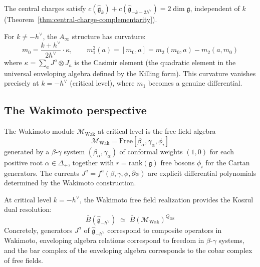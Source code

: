 \begin{remark}\label{rem:km-central-charge-sum}
The central charges satisfy $c(\widehat{\mathfrak{g}}_k) + c(\widehat{\mathfrak{g}}_{-k-2h^\vee}) = 2\dim\mathfrak{g}$, independent of $k$ (Theorem~\ref{thm:central-charge-complementarity}).
\end{remark}

\begin{definition}\label{def:curved-koszul-km}
For $k \neq -h^\vee$, the $A_\infty$ structure has curvature:
\begin{equation}
m_0 = \frac{k+h^\vee}{2h^\vee} \cdot \kappa, \qquad m_1^2(a) = [m_0, a] = m_2(m_0, a) - m_2(a, m_0)
\end{equation}
where $\kappa = \sum_a J^a \otimes J_a$ is the Casimir element (the quadratic element in the universal enveloping algebra defined by the Killing form).  This curvature vanishes precisely at $k = -h^\vee$ (critical level), where $m_1$ becomes a genuine differential.
\end{definition}

\subsection{The Wakimoto perspective}

\begin{definition}\label{def:wakimoto}
The Wakimoto module $\mathcal{M}_{\mathrm{Wak}}$ at critical level is the free field algebra
\begin{equation}
\mathcal{M}_{\mathrm{Wak}} = \mathrm{Free}[\beta_\alpha, \gamma_\alpha, \phi_i]
\end{equation}
generated by a $\beta$-$\gamma$ system $(\beta_\alpha, \gamma_\alpha)$ of conformal weights $(1, 0)$ for each positive root $\alpha \in \Delta_+$, together with $r = \mathrm{rank}(\mathfrak{g})$ free bosons $\phi_i$ for the Cartan generators.  The currents $J^a = f^a(\beta, \gamma, \phi, \partial\phi)$ are explicit differential polynomials determined by the Wakimoto construction.
\end{definition}

\begin{theorem}\label{thm:wakimoto-koszul}
At critical level $k = -h^\vee$, the Wakimoto free field realization provides the Koszul dual resolution:
\begin{equation}
\bar{B}(\widehat{\mathfrak{g}}_{-h^\vee}) \;\simeq\; \bar{B}(\mathcal{M}_{\mathrm{Wak}})^{Q_{\mathrm{DS}}}
\end{equation}
Concretely, generators $J^a$ of $\widehat{\mathfrak{g}}_{-h^\vee}$ correspond to composite operators in Wakimoto, enveloping algebra relations correspond to freedom in $\beta$-$\gamma$ systems, and the bar complex of the enveloping algebra corresponds to the cobar complex of free fields.
\end{theorem}

